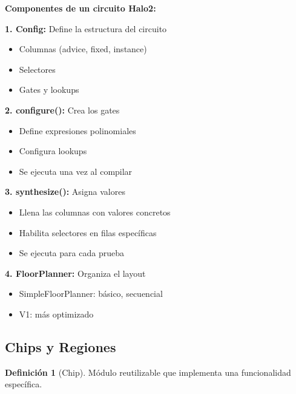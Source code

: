 \documentclass[11pt,a4paper,twoside,openright]{book}
\theoremstyle{definition}
\newtheorem{definition}{Definición}[chapter]
\theoremstyle{plain}
\theoremstyle{remark}
\begin{document}
\begin{keyidea}
\textbf{Componentes de un circuito Halo2:}

\textbf{1. Config:} Define la estructura del circuito
\begin{itemize}
    \item Columnas (advice, fixed, instance)
    \item Selectores
    \item Gates y lookups
\end{itemize}

\textbf{2. configure():} Crea los gates
\begin{itemize}
    \item Define expresiones polinomiales
    \item Configura lookups
    \item Se ejecuta una vez al compilar
\end{itemize}

\textbf{3. synthesize():} Asigna valores
\begin{itemize}
    \item Llena las columnas con valores concretos
    \item Habilita selectores en filas específicas
    \item Se ejecuta para cada prueba
\end{itemize}

\textbf{4. FloorPlanner:} Organiza el layout
\begin{itemize}
    \item SimpleFloorPlanner: básico, secuencial
    \item V1: más optimizado
\end{itemize}
\end{keyidea}

\subsection{Chips y Regiones}

\begin{definition}[Chip]
Módulo reutilizable que implementa una funcionalidad específica.
\end{definition}
\end{document}
